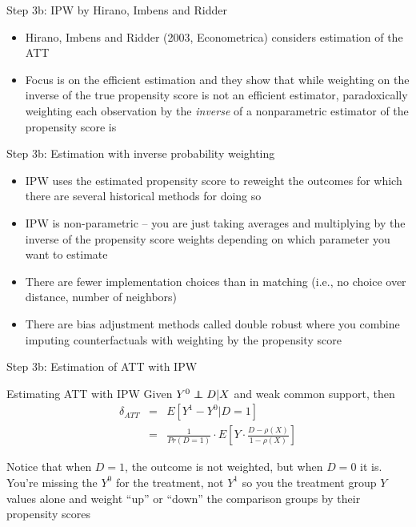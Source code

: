 \documentclass{beamer}
\newcommand\independent{\protect\mathpalette{\protect\independenT}{\perp}}
\def\independenT#1#2{\mathrel{\rlap{$#1#2$}\mkern2mu{#1#2}}}
\begin{document}
	

\begin{frame}{Step 3b: IPW by Hirano, Imbens and Ridder}

\begin{itemize} 
\item Hirano, Imbens and Ridder (2003, Econometrica) considers estimation of the ATT
\item Focus is on the efficient estimation and they show that while weighting on the inverse of the true propensity score is not an efficient estimator, paradoxically weighting each observation by the \emph{inverse} of a nonparametric estimator of the propensity score is
\end{itemize}

\end{frame}


\begin{frame}{Step 3b: Estimation with inverse probability weighting}

\begin{itemize}
	\item IPW uses the estimated propensity score to reweight the outcomes for which there are several historical methods for doing so
	\item IPW is non-parametric -- you are just taking averages and multiplying by the inverse of the propensity score weights depending on which parameter you want to estimate
	\item There are fewer implementation choices than in matching (i.e., no choice over distance, number of neighbors)
	\item There are bias adjustment methods called double robust where you combine imputing counterfactuals with weighting by the propensity score
\end{itemize}

\end{frame}
	


	

\begin{frame}{Step 3b: Estimation of ATT with IPW}
	
		\begin{block}{Estimating ATT with IPW}
	Given $Y^0 \independent{D}|X$ and weak common support, then
		\begin{eqnarray*}
		\delta_{ATT}&=&E[Y^1-Y^0|D=1] \\
		&=& \frac{1}{Pr(D=1)} \cdot  E \left[ Y \cdot \frac{D-\rho(X)}{1-\rho(X)} \right]
		\end{eqnarray*}
	\end{block}Notice that when $D=1$, the outcome is not weighted, but when $D=0$ it is. You're missing the $Y^0$ for the treatment, not $Y^1$ so you the treatment group $Y$ values alone and weight ``up'' or ``down'' the comparison groups by their propensity scores

\end{frame}
\end{document}

